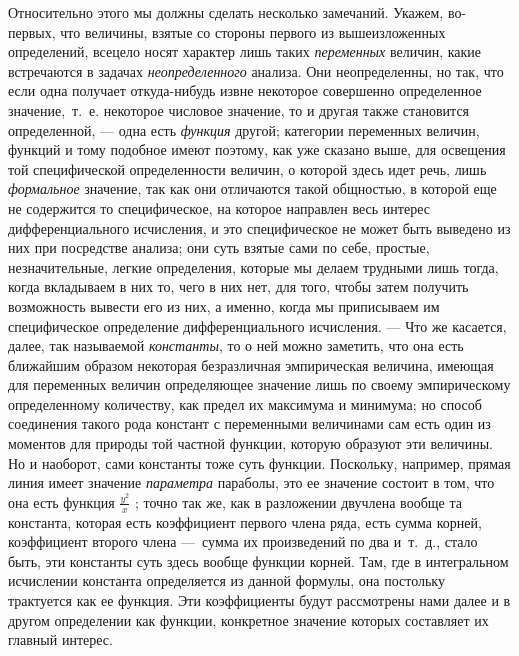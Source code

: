 Относительно этого мы должны сделать несколько замечаний. Укажем, во-первых,
что величины, взятые со стороны первого из вышеизложенных определений,
всецело носят характер лишь таких {\em переменных}
величин, какие встречаются в задачах
{\em неопределенного} анализа. Они неопределенны, но
так, что если одна получает откуда-нибудь извне некоторое совершенно
определенное значение,~т.~е. некоторое числовое значение, то и другая также
становится определенной, — одна есть {\em функция}
другой; категории переменных величин, функций и тому подобное имеют
поэтому, как уже сказано выше, для освещения той специфической
определенности величин, о которой здесь идет речь, лишь
{\em формальное} значение, так как они отличаются такой
общностью, в которой еще не содержится то специфическое, на которое
направлен весь интерес дифференциального исчисления, и это специфическое не
может быть выведено из них при посредстве анализа; они суть взятые сами по
себе, простые, незначительные, легкие определения, которые мы делаем
трудными лишь тогда, когда вкладываем в них то, чего в них нет, для того,
чтобы затем получить возможность вывести его из них, а именно, когда мы
приписываем им специфическое определение дифференциального исчисления. — Что
же касается, далее, так называемой {\em константы}, то
о ней можно заметить, что она есть ближайшим образом некоторая безразличная
эмпирическая величина, имеющая для переменных величин определяющее значение
лишь по своему эмпирическому определенному количеству, как предел их
максимума и минимума; но способ соединения такого рода констант с
переменными величинами сам есть один из моментов для природы той частной
функции, которую образуют эти величины. Но и наоборот, сами константы тоже
суть функции. Поскольку, например, прямая линия имеет значение
{\em параметра} параболы, это ее значение состоит в
том, что она есть функция  $\frac{y^2} x$  ; точно так же, как в разложении
двучлена вообще та константа, которая есть коэффициент первого члена ряда,
есть сумма корней, коэффициент второго члена —~сумма их произведений по два
и~т.~д., стало быть, эти константы суть здесь вообще функции корней. Там,
где в интегральном исчислении константа определяется из данной формулы, она
постольку трактуется как ее функция. Эти коэффициенты будут рассмотрены нами
далее и в другом определении как функции, конкретное значение которых
составляет их главный интерес.

